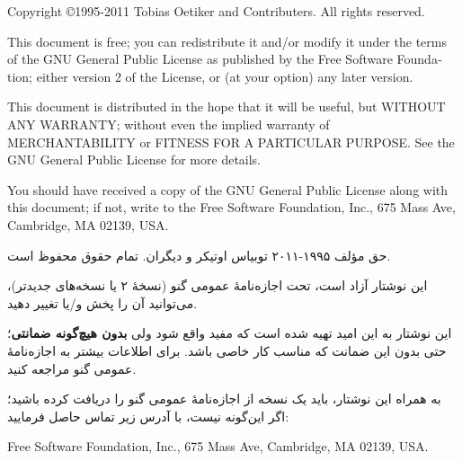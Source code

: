 \pagebreak
\thispagestyle{empty}
\begin{small}
\begin{latin} 
  Copyright \copyright 1995-2011 Tobias Oetiker and Contributers.  All rights reserved.
 
  This document is free; you can redistribute it and/or modify it
  under the terms of the GNU General Public License as published by
  the Free Software Foundation; either version 2 of the License, or
  (at your option) any later version.
  
  This document is distributed in the hope that it will be useful, but
  WITHOUT ANY WARRANTY; without even the implied warranty of
  MERCHANTABILITY or FITNESS FOR A PARTICULAR PURPOSE\@.  See the GNU
  General Public License for more details.
  
  You should have received a copy of the GNU General Public License
  along with this document; if not, write to the Free Software
  Foundation, Inc., 675 Mass Ave, Cambridge, MA 02139, USA.

\end{latin}

\medskip 
حق مؤلف ۱۹۹۵-۲۰۱۱ \lr{\copyright} توبیاس اوتیکر و دیگران. تمام حقوق محفوظ است.

این نوشتار آزاد است، تحت اجازه‌نامهٔ عمومی گنو (نسخهٔ ۲ یا نسخه‌های جدیدتر)، می‌توانید آن را پخش و/یا تغییر دهید.

این نوشتار به این امید تهیه شده است که مفید واقع شود ولی \textbf{بدون هیچ‌گونه ضمانتی}؛ حتی بدون این ضمانت که مناسب کار خاصی باشد. برای اطلاعات بیشتر به اجازه‌نامهٔ عمومی گنو مراجعه کنید.

به همراه این نوشتار، باید یک نسخه از اجازه‌نامهٔ عمومی گنو را دریافت کرده باشید؛ اگر این‌گونه نیست، با آدرس زیر تماس حاصل فرمایید:

\begin{latin}
 Free Software   Foundation, Inc., 675 Mass Ave, Cambridge, MA 02139, USA.
\end{latin}

\end{small}

\endinput

%

